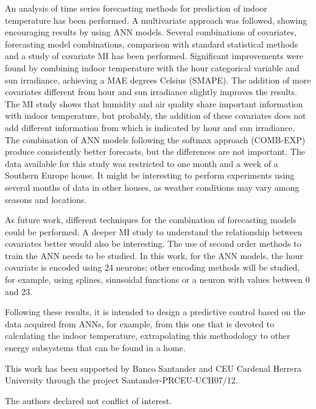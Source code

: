 \documentclass[energies,article,accept,moreauthors,pdftex,12pt,a4paper]{mdpi}
\newcommand{\ann}{ANN\xspace}
\newcommand{\anns}{ANNs\xspace}
\newcommand{\comb}{COMB-EXP\xspace}
\begin{document}
An analysis of time series forecasting methods for prediction of indoor
temperature has been performed. A multivariate approach was followed, showing
encouraging results by using \ann models. Several combinations of covariates,
forecasting model combinations, comparison with standard statistical methods
and a study of covariate MI has been performed. Significant improvements were
found by combining indoor temperature with the hour categorical variable and sun
irradiance, achieving a MAE degrees Celsius (SMAPE). The addition of more covariates different from hour and sun
irradiance slightly improves the results. The MI study shows that humidity and
air quality share important information with indoor temperature, but probably,
the addition of these covariates does not add different information from which is indicated by hour and sun irradiance. The combination of \ann models
following the softmax approach (\comb) produce consistently better forecasts,
but the differences are not important. The data available for this study was
restricted to one month and a week of a Southern Europe house. It might be interesting to
perform experiments using several months of data in other houses, as weather
conditions may vary among seasons and locations.

As future work, different techniques for the combination of forecasting models
could be performed. \linebreak A deeper MI study to understand the relationship
between covariates better would also be interesting. The use of second order methods to
train the \ann needs to be studied. In this work, for the \ann models, the hour
covariate is encoded using 24 neurons; other encoding methods will be studied, for example, using splines, sinusoidal functions or a neuron with
values between 0 and 23.

Following these results, it is intended to design a
predictive control based on the data acquired \linebreak from \anns, for example, from
this one that is devoted to calculating the indoor temperature, extrapolating this
methodology to other energy subsystems that can be found in a home.


This work has been supported by Banco Santander and CEU Cardenal Herrera University 
through the project Santander-PRCEU-UCH07/12.


The authors declared not conflict of interest.
\end{document}
